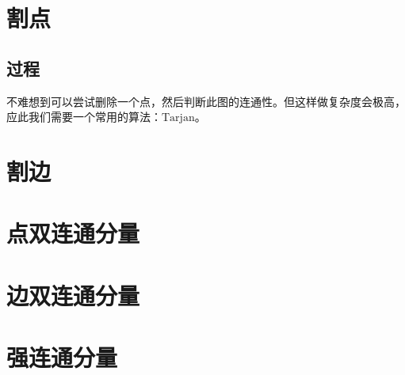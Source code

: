 \documentclass[11pt,oneside,a4paper,UTF8]{book}
\begin{document}
	
	\section{割点}
	\subsection{过程}
	不难想到可以尝试删除一个点，然后判断此图的连通性。但这样做复杂度会极高，应此我们需要一个常用的算法：$\text{Tarjan}$。\par
	
	
	
	
	\section{割边}
	\section{点双连通分量}
	\section{边双连通分量}
	\section{强连通分量}
	
	
\end{document}
